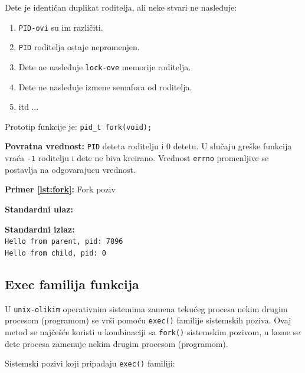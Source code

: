 \documentclass[a4paper, 11pt, twoside]{article}
\newcommand{\scode}[3] {
	\hspace{.06\textwidth} 
	\begin{minipage}[t]{.88\textwidth} %
		\begin{mdframed}[topline=true,bottomline=true,leftline=true,rightline=true,backgroundcolor=gray!22, linecolor=gray!60!black,roundcorner=1mm]
			 

	\begin{center}
		\caption{\textbf{Primer \ref{lst:#3}:} #2}
	\end{center}
	\end{mdframed}
	\end{minipage}

}
\newcommand{\stdio}[4] {
	\hspace{.06\textwidth} 
	\begin{minipage}[t]{.88\textwidth} %
		\begin{mdframed}[backgroundcolor=black!7,topline=true,bottomline=true,leftline=true,rightline=true,roundcorner=1mm]
		\begin{minipage}[t]{.5\textwidth} %
			\textbf{#1} \\
				\texttt{#3}
		\end{minipage}
		\begin{minipage}[t]{.5\textwidth} %
			\textbf{#2} \\
				\texttt{#4}
		\end{minipage}
		\end{mdframed}
	\end{minipage}
	\vspace{3mm} 
}
\begin{document}
Dete je identičan duplikat roditelja, ali neke stvari ne nasleđuje:
\vspace{-3mm} 
\begin{enumerate}[1)]
	\item{\texttt{PID-ovi} su im različiti.}
	\item{\texttt{PID} roditelja ostaje nepromenjen.}
	\item{Dete ne nasleđuje \texttt{lock-ove} memorije roditelja.}
	 \item{Dete ne nasleđuje izmene semafora od roditelja.}
	 \item[]{itd ...}
\end{enumerate}

Prototip funkcije je: \texttt{pid\_t fork(void);} \\

\vspace{-6mm} 

\textbf{Povratna vrednost:} \texttt{PID} deteta roditelju i 0 detetu. U slučaju greške funkcija vraća \texttt{-1} roditelju i dete ne biva kreirano. Vrednost \texttt{errno} promenljive se postavlja na odgovarajucu vrednost.

\scode{fork.c}{Fork poziv}{fork}
\stdio{Standardni ulaz:}{Standardni izlaz:}{}{Hello from parent, pid: 7896 \\ Hello from child, pid: 0}


\newpage

\subsection{Exec familija funkcija}

U \texttt{unix-olikim} operativnim sistemima zamena tekućeg procesa nekim drugim procesom (programom) se vrši pomoću \texttt{exec()} familije sistemskih poziva. Ovaj metod se najčešće koristi u kombinaciji sa \texttt{fork()} sistemskim pozivom, u kome se dete procesa zamenuje nekim drugim procesom (programom). 

Sistemski pozivi koji pripadaju \texttt{exec()} familiji:
\end{document}
